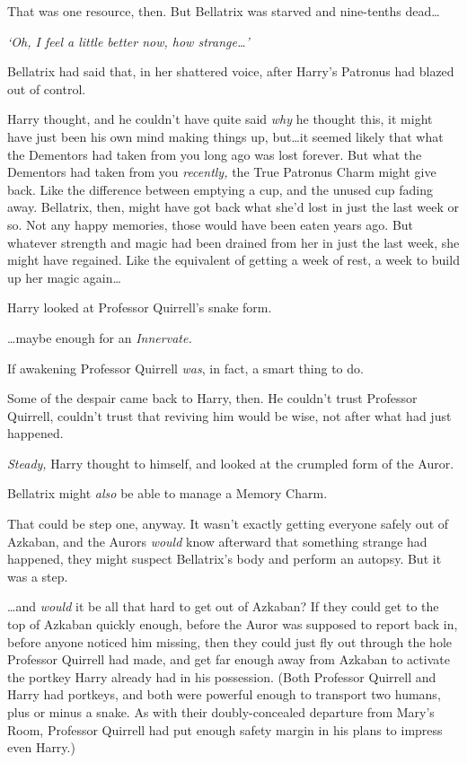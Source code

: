 That was one resource, then. But Bellatrix was starved and nine-tenths dead…

\emph{‘Oh, I feel a little better now, how strange…’}

Bellatrix had said that, in her shattered voice, after Harry’s Patronus had blazed out of control.

Harry thought, and he couldn’t have quite said \emph{why} he thought this, it might have just been his own mind making things up, but…it seemed likely that what the Dementors had taken from you long ago was lost forever. But what the Dementors had taken from you \emph{recently,} the True Patronus Charm might give back. Like the difference between emptying a cup, and the unused cup fading away. Bellatrix, then, might have got back what she’d lost in just the last week or so. Not any happy memories, those would have been eaten years ago. But whatever strength and magic had been drained from her in just the last week, she might have regained. Like the equivalent of getting a week of rest, a week to build up her magic again…

Harry looked at Professor Quirrell’s snake form.

…maybe enough for an \emph{Innervate.}

If awakening Professor Quirrell \emph{was}, in fact, a smart thing to do.

Some of the despair came back to Harry, then. He couldn’t trust Professor Quirrell, couldn’t trust that reviving him would be wise, not after what had just happened.

\emph{Steady,} Harry thought to himself, and looked at the crumpled form of the Auror.

Bellatrix might \emph{also} be able to manage a Memory Charm.

That could be step one, anyway. It wasn’t exactly getting everyone safely out of Azkaban, and the Aurors \emph{would} know afterward that something strange had happened, they might suspect Bellatrix’s body and perform an autopsy. But it was a step.

…and \emph{would} it be all that hard to get out of Azkaban? If they could get to the top of Azkaban quickly enough, before the Auror was supposed to report back in, before anyone noticed him missing, then they could just fly out through the hole Professor Quirrell had made, and get far enough away from Azkaban to activate the portkey Harry already had in his possession. (Both Professor Quirrell and Harry had portkeys, and both were powerful enough to transport two humans, plus or minus a snake. As with their doubly-concealed departure from Mary’s Room, Professor Quirrell had put enough safety margin in his plans to impress even Harry.)

